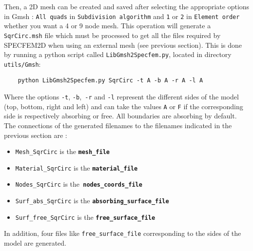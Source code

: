 Then, a 2D mesh can be created and saved after selecting the appropriate
options in Gmsh : \texttt{All quads} in \texttt{Subdivision algorithm}
and \texttt{1} or \texttt{2} in \texttt{Element order} whether you
want a 4 or 9 node mesh. This operation will generate a \texttt{SqrCirc.msh}
file which must be processed to get all the files required by SPECFEM2D
when using an external mesh (see previous section). This is done by
running a python script called \texttt{LibGmsh2Specfem.py}, located in
directory \texttt{utils/Gmsh}:
%
\begin{verbatim}
    python LibGmsh2Specfem.py SqrCirc -t A -b A -r A -l A
\end{verbatim}
%
Where the options \texttt{-t}, \texttt{-b},\texttt{ -r} and \texttt{-l}
represent the different sides of the model (top, bottom, right and
left) and can take the values \texttt{A} or \texttt{F} if the corresponding
side is respectively absorbing or free. All boundaries are absorbing
by default. The connections of the generated filenames to the filenames
indicated in the previous section are :
%
\begin{itemize}
\item \texttt{Mesh\_SqrCirc} is the \texttt{\textbf{mesh\_file}}
\item \texttt{Material\_SqrCirc} is the \texttt{\textbf{material\_file}}
\item \texttt{Nodes\_SqrCirc} is the\texttt{ }\texttt{\textbf{nodes\_coords\_file}}
\item \texttt{Surf\_abs\_SqrCirc} is the \texttt{\textbf{absorbing\_surface\_file}}
\item \texttt{Surf\_free\_SqrCirc} is the \texttt{\textbf{free\_surface\_file}}
\end{itemize}
%
In addition, four files like \texttt{free\_surface\_file} corresponding
to the sides of the model are generated.

